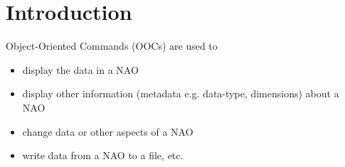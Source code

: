 
  \section{
    \label{Introduction}Introduction
  }
Object-Oriented Commands (OOCs) are used to
  \begin{itemize}
    \item display the data in a NAO
    \item display other information (metadata e.g. data-type, dimensions)
    about a NAO
    \item change data or other aspects of a NAO
    \item write data from a NAO to a file, etc.
  \end{itemize}
